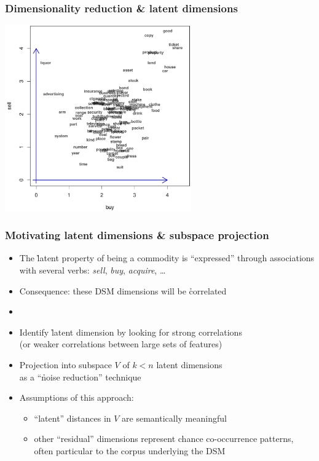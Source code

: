 \begin{frame}[c]
  \frametitle{Dimensionality reduction \& latent dimensions}
  \begin{center}
    \ungap[1]
    \includegraphics[width=8cm]{img/3_buy_sell_labels_only}
  \end{center}
\end{frame}

\begin{frame}
  \frametitle{Motivating latent dimensions \& subspace projection}

  \begin{itemize}
  \item The \h{latent property} of being a commodity is ``expressed''
    through associations with several verbs: \emph{sell}, \emph{buy},
    \emph{acquire}, \ldots
  \item Consequence: these DSM dimensions will be \h{correlated}
  \item[]\pause
  \item Identify \h{latent dimension} by looking for strong correlations\\
    (or weaker correlations between large sets of features)%
  \item Projection into subspace $V$ of $k < n$ latent dimensions\\
    as a ``\h{noise reduction}'' technique \so {}
  \item Assumptions of this approach:
    \begin{itemize}
    \item ``latent'' distances in $V$ are semantically meaningful
    \item other ``residual'' dimensions represent chance co-occurrence
      patterns, often particular to the corpus underlying the DSM
    \end{itemize}
  \end{itemize}
\end{frame}


